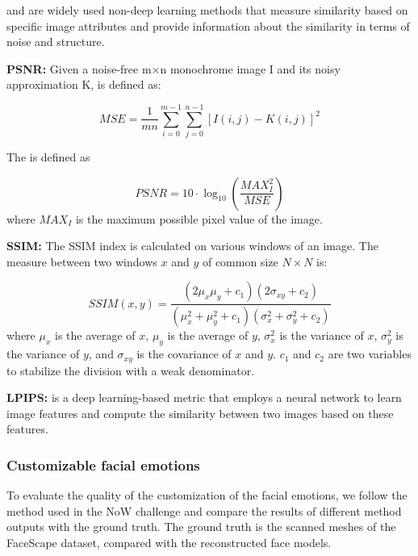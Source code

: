  and  are widely used non-deep learning methods that measure similarity based on specific image attributes and provide information about the similarity in terms of noise and structure.

\textbf{PSNR:} Given a noise-free m×n monochrome image I and its noisy approximation K,  is defined as:

\begin{equation}
    MSE = \frac{1}{mn}\sum_{i=0}^{m-1}\sum_{j=0}^{n-1}[I(i,j)-K(i,j)]^2
\end{equation}

The  is defined as

\begin{equation}
    PSNR = 10\cdot\log_{10}\left(\frac{MAX_I^2}{MSE}\right)
\end{equation}
where $MAX_{I}$ is the maximum possible pixel value of the image.

\textbf{SSIM:} The SSIM index is calculated on various windows of an image. The measure between two windows $x$ and $y$ of common size $N \times N$ is:

\begin{equation}
    SSIM(x,y) = \frac{(2\mu_x\mu_y + c_1)(2\sigma_{xy}+c_2)}{(\mu_x^2+\mu_y^2+c_1)(\sigma_x^2+\sigma_y^2+c_2)}
\end{equation}
where $\mu_x$ is the average of $x$, $\mu_y$ is the average of $y$, $\sigma_x^2$ is the variance of $x$, $\sigma_y^2$ is the variance of $y$, and $\sigma_{xy}$ is the covariance of $x$ and $y$. $c_1$ and $c_2$ are two variables to stabilize the division with a weak denominator.


\textbf{LPIPS:}  \cite{zhangUnreasonableEffectivenessDeep2018} is a deep learning-based metric that employs a neural network to learn image features and compute the similarity between two images based on these features.

\subsubsection{Customizable facial emotions}
To evaluate the quality of the customization of the facial emotions, we follow the method used in the NoW challenge and compare the results of different method outputs with the ground truth. The ground truth is the scanned meshes of the FaceScape dataset, compared with the reconstructed face models.

